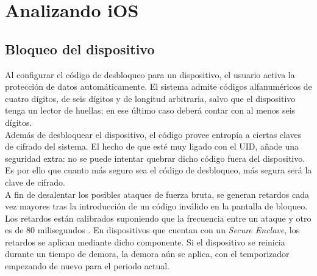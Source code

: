 \section{Analizando iOS}
\subsection{Bloqueo del dispositivo}
Al configurar el código de desbloqueo para un dispositivo, el usuario activa la protección de datos automáticamente. El sistema admite códigos alfanuméricos de cuatro dígitos, de seis dígitos y de longitud arbitraria, salvo que el dispositivo tenga un lector de huellas; en ese último caso deberá contar con al menos seis dígitos.\\

Además de desbloquear el dispositivo, el código provee entropía a ciertas claves de cifrado del sistema. El hecho de que esté muy ligado con el UID, añade una seguridad extra: no se puede intentar quebrar dicho código fuera del dispositivo. Es por ello que cuanto más seguro sea el código de desbloqueo, más segura será la clave de cifrado.\\

A fin de desalentar los posibles ataques de fuerza bruta, se generan retardos cada vez mayores tras la introducción de un código inválido en la pantalla de bloqueo. Los retardos están calibrados suponiendo que la frecuencia entre un ataque y otro es de 80 milisegundos \cite{asg}. En dispositivos que cuentan con un \textit{Secure Enclave}, los retardos se aplican mediante dicho componente. Si el dispositivo se reinicia durante un tiempo de demora, la demora aún se aplica, con el temporizador empezando de nuevo para el periodo actual.
